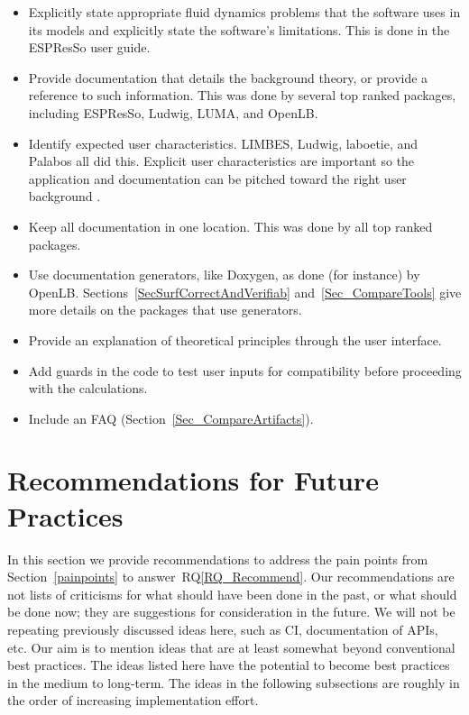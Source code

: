 \documentclass[final, 3p, times, authoryear]{elsarticle}
\newcommand{\rqref}[1]{RQ\ref{#1}}
\begin{document}
\begin{itemize}
	\item Explicitly state appropriate fluid dynamics problems that the software
	uses in its models and explicitly state the software's limitations. This is
	done in the ESPResSo user guide.
	\item Provide documentation that details the background theory, or provide a
	reference to such information. This was done by several top ranked packages,
	including ESPResSo, Ludwig, LUMA, and OpenLB.
	\item Identify expected user characteristics. LIMBES, Ludwig, laboetie, and
	Palabos all did this. Explicit user characteristics are important so the
	application and documentation can be pitched toward the right user
	background \citep{SmithEtAl2007}.
	\item Keep all documentation in one location. This was done by all top
	ranked packages.
	\item Use documentation generators, like Doxygen, as done (for instance) by
	OpenLB.  Sections~\ref{SecSurfCorrectAndVerifiab} and~\ref{Sec_CompareTools}
	give more details on the packages that use generators.
	\item Provide an explanation of theoretical principles through the user
	interface.
	\item Add guards in the code to test user inputs for compatibility before
	proceeding with the calculations.
	\item Include an FAQ (Section~\ref{Sec_CompareArtifacts}).
\end{itemize}

\section{Recommendations for Future Practices} \label{Sec_Recommendations}

In this section we provide recommendations to address the pain points from
Section~\ref{painpoints} to answer~\rqref{RQ_Recommend}.  Our recommendations
are not lists of criticisms for what should have been done in the past, or what
should be done now; they are suggestions for consideration in the future. We
will not be repeating previously discussed ideas here, such as CI, documentation
of APIs, etc.  Our aim is to mention ideas that are at least somewhat beyond
conventional best practices. The ideas listed here have the potential to become
best practices in the medium to long-term. The ideas in the following
subsections are roughly in the order of increasing implementation effort.
\end{document}

